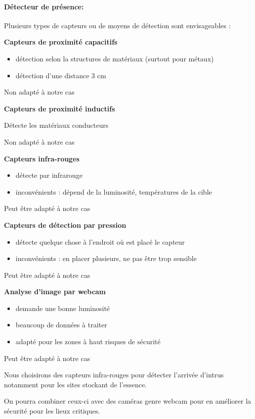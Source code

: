 \documentclass{mise_en_page}
\begin{document}
\paragraph{Détecteur de présence:}

Plusieurs types de capteurs ou de moyens de détection sont envisageables
:

\textbf{Capteurs de proximité capacitifs}

\begin{itemize}
\item détection selon la structures de matériaux (surtout pour métaux)
\item détection d’une distance 3 cm
\end{itemize}

Non adapté à notre cas

\textbf{Capteurs de proximité inductifs}

Détecte les matériaux conducteurs

Non adapté à notre cas

\textbf{Capteurs infra-rouges}

\begin{itemize}
\item détecte par infrarouge
\item inconvénients : dépend de la luminosité, températures de la cible
\end{itemize}
Peut être adapté à notre cas

\textbf{Capteurs de détection par pression}

\begin{itemize}
\item détecte quelque chose à l’endroit où est placé le capteur
\item inconvénients : en placer plusieurs, ne pas être trop sensible
\end{itemize}
Peut être adapté à notre cas

\textbf{Analyse d’image par webcam}
\begin{itemize}
\item demande une bonne luminosité
\item beaucoup de données à traiter
\item adapté pour les zones à haut risques de sécurité
\end{itemize}
Peut être adapté à notre cas

Nous choisirons des capteurs infra-rouges pour détecter l’arrivée
d’intrus notamment pour les sites stockant de l’essence.

On pourra combiner ceux-ci avec des caméras genre webcam pour en
améliorer la sécurité pour les lieux critiques.
\end{document}
